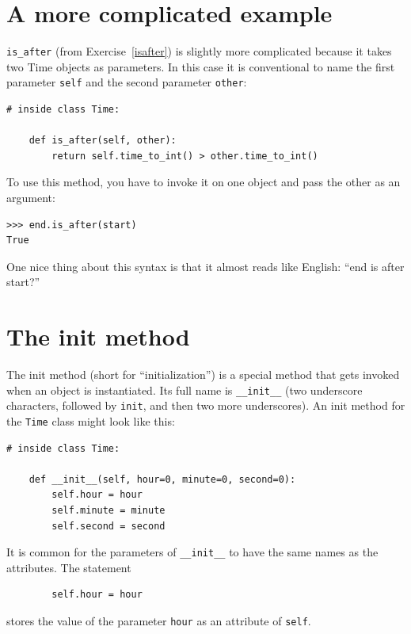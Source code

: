 \documentclass[12pt,a4paper,final,twoside,onecolumn,titlepage]{book}
\begin{document}
\section{A more complicated example}

\verb"is_after" (from Exercise~\ref{isafter}) is slightly more complicated
because it takes two Time objects as parameters.  In this case it is
conventional to name the first parameter {\tt self} and the second
parameter {\tt other}:

\begin{verbatim}
# inside class Time:

    def is_after(self, other):
        return self.time_to_int() > other.time_to_int()
\end{verbatim}
%
To use this method, you have to invoke it on one object and pass
the other as an argument:

\begin{verbatim}
>>> end.is_after(start)
True
\end{verbatim}
%
One nice thing about this syntax is that it almost reads
like English: ``end is after start?''


\section{The init method}

The init method (short for ``initialization'') is
a special method that gets invoked when an object is instantiated.  
Its full name is \verb"__init__" (two underscore characters,
followed by {\tt init}, and then two more underscores).  An
init method for the {\tt Time} class might look like this:

\begin{verbatim}
# inside class Time:

    def __init__(self, hour=0, minute=0, second=0):
        self.hour = hour
        self.minute = minute
        self.second = second
\end{verbatim}
%
It is common for the parameters of \verb"__init__"
to have the same names as the attributes.  The statement

\begin{verbatim}
        self.hour = hour
\end{verbatim}
%
stores the value of the parameter {\tt hour} as an attribute
of {\tt self}.
\end{document}
